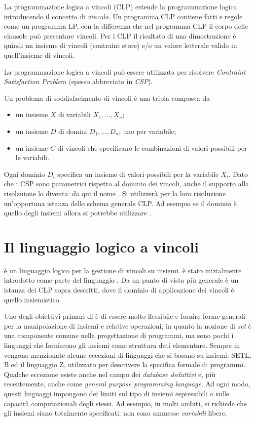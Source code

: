 \documentclass[12pt,a4paper,openright]{book} %
\begin{document}
La programmazione logica a vincoli (CLP) estende la programmazione
logica introducendo il concetto di \emph{vincolo}. Un programma CLP
contiene fatti e regole come un programma LP, con la differenza che
nel programma CLP il corpo delle clausole può presentare vincoli. Per
i CLP il risultato di una dimostrazione è quindi un insieme di vincoli
(contraint store) e/o un valore letterale valido in quell'insieme di
vincoli.

La programmazione logica a vincoli può essere utilizzata per risolvere
\emph{Contraint Satisfaction Problem} (spesso abbreviato in
\emph{CSP}).

Un problema di soddisfacimento di vincoli è una tripla composta da
\begin{itemize}
	\item un insieme $X$ di variabili ${X_1, \ldots, X_n}$;
	\item un insieme $D$ di domini ${D_1, \ldots, D_n}$, uno per
          variabile;
	\item un insieme $C$ di vincoli che specificano le
          combinazioni di valori possibili per le variabili.
\end{itemize}

Ogni dominio $D_i$ specifica un insieme di valori possibili per la
variabile $X_i$. Dato che i CSP sono parametrici rispetto al dominio
dei vincoli, anche il supporto alla risolzuione lo diventa: da qui il
nome \clpset{}. Si utilizzerà per la loro risoluzione un’opportuna
istanza dello schema generale CLP. Ad esempio se il dominio è quello
degli insiemi allora si potrebbe utilizzare \clpset{}.

\section{Il linguaggio logico a vincoli \lset{}}
\label{sec:clpbasedlang_lset}

\lset{} è un linguaggio logico per la gestione di vincoli su
insiemi. \lset{} è stato inizialmente introdotto come parte del
linguaggio \clpset{} \cite{Dovier00}. Da un punto di vista più
generale \clpset{} è un istanza dei CLP sopra descritti, dove il
dominio di applicazione dei vincoli è quello insiemistico.

Uno degli obiettivi primari di \clpset{} è di essere molto flessibile
e fornire forme generali per la manipolazione di insiemi e relative
operazioni, in quanto la nozione di \emph{set} è una componente comune
nella progettazione di programmi, ma sono pochi i linguaggi che
forniscono gli insiemi come struttura dati elementare.  Sempre in
\cite{Dovier00} vengono menzionate alcune eccezioni di linguaggi che
si basano su insiemi: SETL, B ed il linguaggio Z, utilizzato per
descrivere la specifica formale di programmi. Qualche eccezione esiste
anche nel campo dei \emph{database deduttivi} e, più recentemente,
anche come \emph{general purpose programming language}. Ad ogni modo,
questi linguaggi impongono dei limiti sul tipo di insiemi espressibili
o sulle capacità computazionali degli stessi. Ad esempio, in molti
ambiti, si richiede che gli insiemi siano totalmente specificati: non
sono ammesse \emph{variabili} libere.
\end{document}

